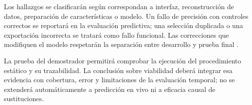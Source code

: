 Los hallazgos se clasificarán según correspondan a interfaz, reconstrucción de datos, preparación de características o modelo. Un fallo de precisión con controles correctos se reportará en la evaluación predictiva; una selección duplicada o una exportación incorrecta se tratará como fallo funcional. Las correcciones que modifiquen el modelo respetarán la separación entre desarrollo y prueba final \cite{cawley2010selection}.

La prueba del demostrador permitirá comprobar la ejecución del procedimiento estático y su trazabilidad. La conclusión sobre viabilidad deberá integrar esa evidencia con cobertura, error y limitaciones de la evaluación temporal; no se extenderá automáticamente a predicción en vivo ni a eficacia causal de sustituciones.
\endgroup
